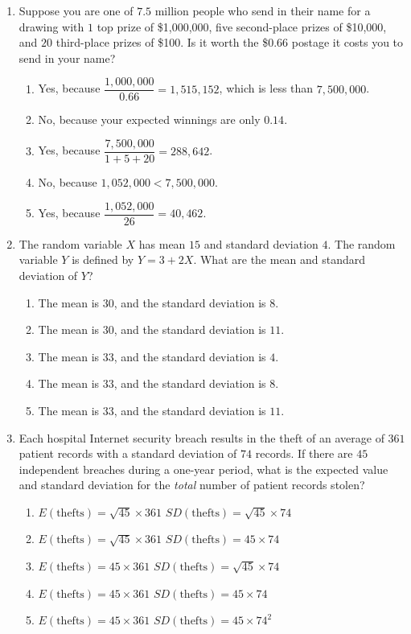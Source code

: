 \documentclass{article}
\begin{document}
\begin{enumerate}[label=\textbf{S\arabic*.}]
\item Suppose you are one of $7.5$ million people who send in their name for a drawing with $1$ top prize of \$1,000,000, five second-place prizes of \$10,000, and $20$ third-place prizes of \$100. Is it worth the \$0.66 postage it costs you to send in your name? 
\begin{enumerate}
  \item Yes, because $\dfrac{1,000,000}{0.66} = 1,515,152$, which is less than $7,500,000$.
  \item No, because your expected winnings are only $0.14$.
  \item Yes, because $\dfrac{7,500,000}{1+5+20} = 288,642$.
  \item No, because $1,052,000 < 7,500,000$.
  \item Yes, because $\dfrac{1,052,000}{26} = 40,462$.
\end{enumerate}

\item The random variable $X$ has mean $15$ and standard deviation $4$. The random variable $Y$ is defined by $Y=3+2X$. What are the mean and standard deviation of $Y$? 
\begin{enumerate}
  \item The mean is $30$, and the standard deviation is $8$.
  \item The mean is $30$, and the standard deviation is $11$.
  \item The mean is $33$, and the standard deviation is $4$.
  \item The mean is $33$, and the standard deviation is $8$.
  \item The mean is $33$, and the standard deviation is $11$.
\end{enumerate}

\item Each hospital Internet security breach results in the theft of an average of $361$ patient records with a standard deviation of $74$ records. If there are $45$ independent breaches during a one-year period, what is the expected value and standard deviation for the \emph{total} number of patient records stolen? 
\begin{enumerate}
  \item $E(\text{thefts})=\sqrt{45}\times361$ $SD(\text{thefts})=\sqrt{45}\times74$
  \item $E(\text{thefts})=\sqrt{45}\times361$ $SD(\text{thefts})=45\times74$
  \item $E(\text{thefts})=45\times361$ $SD(\text{thefts})=\sqrt{45}\times74$
  \item $E(\text{thefts})=45\times361$ $SD(\text{thefts})=45\times74$
  \item $E(\text{thefts})=45\times361$ $SD(\text{thefts})=45\times74^{2}$
\end{enumerate}


\end{enumerate}
\end{document}
